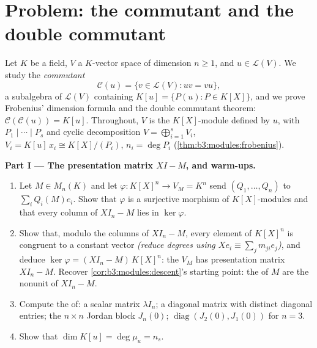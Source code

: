\section{Problem: the commutant and the double commutant}

\begin{problem}\label{pb:b3:modules:1}
Let $K$ be a field, $V$ a $K$-vector space of dimension $n \geq
1$, and $u \in \mathcal L(V)$. We study the \emph{commutant}
\[
\mathcal C(u) = \{v \in \mathcal L(V) : uv = vu\},
\]
a subalgebra of $\mathcal L(V)$ containing $K[u] = \{P(u) : P \in
K[X]\}$, and we prove Frobenius' dimension formula and the double
commutant theorem: $\mathcal C(\mathcal C(u)) = K[u]$. Throughout,
$V$ is the $K[X]$-module defined by $u$, with 
$P_1 \mid \cdots \mid P_s$ and cyclic decomposition $V =
\bigoplus_{i=1}^s V_i$, $V_i = K[u]\,x_i \cong K[X]/(P_i)$, $n_i
= \deg P_i$ (\cref{thm:b3:modules:frobenius}).

\medskip
\noindent\textbf{Part I --- The presentation matrix $XI - M$, and
warm-ups.}
\begin{enumerate}
  \item Let $M \in M_n(K)$ and let $\varphi \colon K[X]^n \to V_M
        = K^n$ send $(Q_1, \dots, Q_n)$ to $\sum_i Q_i(M)e_i$.
        Show that $\varphi$ is a surjective morphism of
        $K[X]$-modules and that every column of $XI_n - M$ lies
        in $\ker\varphi$.
  \item Show that, modulo the columns of $XI_n - M$, every
        element of $K[X]^n$ is congruent to a constant vector
        \emph{(reduce degrees using $Xe_i \equiv \sum_j m_{ji}e_j$)},
        and deduce $\ker\varphi = (XI_n - M)\,K[X]^n$: the 
        $V_M$ has presentation matrix $XI_n - M$. Recover
        \cref{cor:b3:modules:descent}'s starting point: the
         of $M$ are the nonunit  of $XI_n - M$.
  \item Compute the  of: a scalar matrix
        $\lambda I_n$; a diagonal matrix with distinct diagonal
        entries; the $n \times n$ Jordan block $J_n(0)$;
        $\operatorname{diag}(J_2(0), J_1(0))$ for $n = 3$.
  \item Show that $\dim K[u] = \deg \mu_u = n_s$.
\end{enumerate}


\end{problem}
